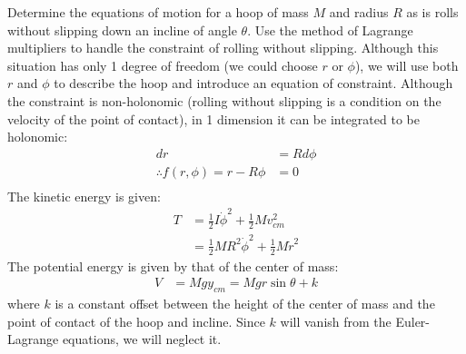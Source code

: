 \begin{example}{0pt}{Determine the equations of motion for a hoop of mass $M$ and radius $R$ as is rolls without slipping down an incline of angle $\theta$. Use the method of Lagrange multipliers to handle the constraint of rolling without slipping.}{}
Although this situation has only 1 degree of freedom (we could choose $r$ or $\phi$), we will use both $r$ and $\phi$ to describe the hoop and introduce an equation of constraint. Although the constraint is non-holonomic (rolling without slipping is a condition on the velocity of the point of contact), in 1 dimension it can be integrated to be holonomic:
\begin{align*}
dr&=Rd\phi\\
\therefore f(r,\phi)=r-R\phi &=0\\
\end{align*}
The kinetic energy is given:
\begin{align*}
T&=\frac{1}{2}I\dot{\phi}^2+\frac{1}{2}Mv_{cm}^2\\
&=\frac{1}{2}MR^2\dot{\phi}^2+\frac{1}{2}M\dot{r}^2
\end{align*}
The potential energy is given by that of the center of mass:
\begin{align*}
V&=Mgy_{cm}=Mgr\sin{\theta}+k
\end{align*}
where $k$ is a constant offset between the height of the center of mass and the point of contact of the hoop and incline. Since $k$ will vanish from the Euler-Lagrange equations, we will neglect it.


\end{example}
